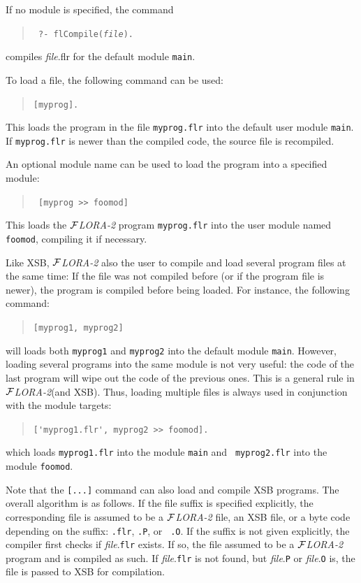 \documentclass[11pt]{article}
\newcommand{\FLORA}{{\mbox{${\cal F}${\small\it LORA}\rm\emph{-2}}}\xspace}
\begin{document}
If no module is specified, the command
\begin{quote}
 \tt
 ?- flCompile({\it file}).
\end{quote}
compiles {\it file}.flr for the default module {\tt main}.


%
To load a file, the following command can be used:
\begin{quote}
 \tt [myprog].  
\end{quote}
This loads the program in the file {\tt myprog.flr} into the default user
module {\tt main}. If {\tt myprog.flr} is newer than the compiled code, the
source file is recompiled.

An optional module name can be used to load the program into a specified
module:
\begin{quote}
  \tt
[myprog >> foomod]
\end{quote}
This loads the \FLORA program {\tt myprog.flr} into the user module named {\tt
  foomod}, compiling it if necessary.

Like XSB, \FLORA also the user to compile and load several program
files at the same time: If the file was not compiled before (or if the
program file is newer), the program is compiled before being loaded.  For
instance, the following command:
\begin{quote}
\verb|[myprog1, myprog2]|
\end{quote}
will loads both {\tt myprog1} and {\tt myprog2} into the default module
{\tt main}. However, loading several programs into the same module is not
very useful: the code of the last program will wipe out the code of the
previous ones. This is a general rule in \FLORA (and XSB). Thus, loading
multiple files is always used in conjunction with the module targets:
\begin{quote}
\verb|['myprog1.flr', myprog2 >> foomod].|
\end{quote}
which loads {\tt myprog1.flr} into the module {\tt main} and {\tt
  myprog2.flr} into the module {\tt foomod}.

Note that the {\tt [...]} command can also load and compile XSB programs.
The overall algorithm is as follows. If the file suffix is specified
explicitly, the corresponding file is assumed to be a \FLORA file, an XSB
file, or a byte code depending on the suffix: {\tt .flr}, {\tt .P}, or {\tt
  .O}. If the suffix is not given explicitly, the compiler first checks if
{\it file}.{\tt flr} exists. If so, the file assumed to be a \FLORA program
and is compiled as such. If {\it file}.{\tt flr} is not found, but {\it
  file}.{\tt P} or {\it file}.{\tt O} is, the file is passed to XSB for
compilation.
\end{document}
